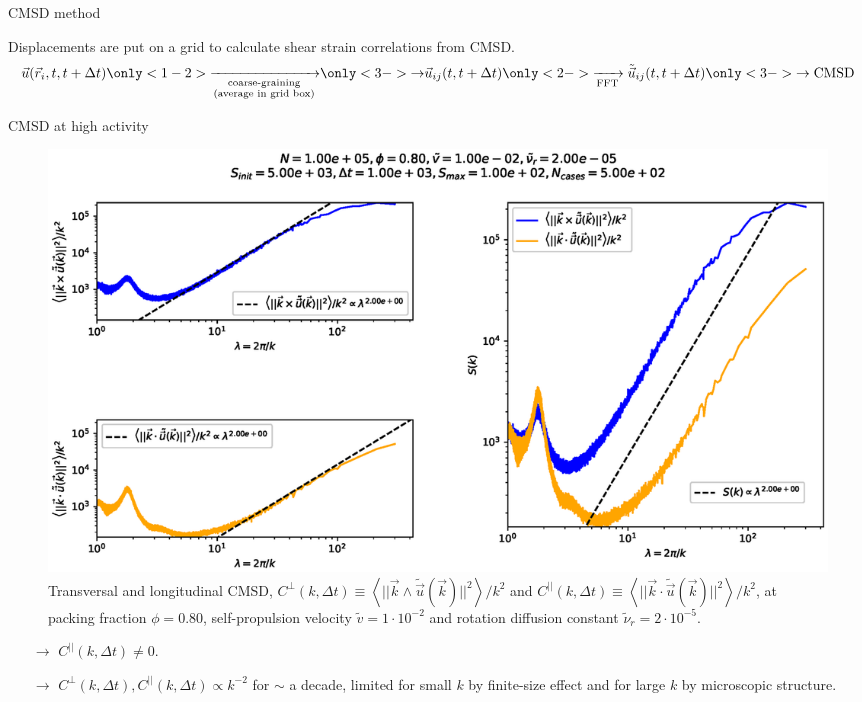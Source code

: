 \documentclass{beamer}
\begin{document}
\begin{frame}{CMSD method}

Displacements are put on a grid to calculate shear strain correlations from CMSD.
\begin{align*}
\vec{u}(\vec{r}_i, t, t + \Delta t) \only<1-2>{\xrightarrow[\substack{\text{coarse-graining}\\\text{(average in grid box)}}]{}}\only<3->{\rightarrow} \vec{u}_{ij}(t, t + \Delta t) \only<2->{\xrightarrow[\text{FFT}]{} \tilde{\vec{u}}_{ij}(t, t + \Delta t)}
\only<3->{\rightarrow \text{CMSD}}
\end{align*}

\end{frame}

\begin{frame}{CMSD at high activity}

\vspace{-0.2cm}
\begin{figure}[h!]
  \centering
  \includegraphics[width=0.8\linewidth]{Cttb_Dk8000_Vj1000_Rg2000_Nq1000_Io5000_Tl1000_Mn1000_Cn5000_Bn3000_XN1500_Yn1500.eps}
  \vspace{-0.8cm}
  \caption{Transversal and longitudinal CMSD, $C^{\perp}(k, \Delta t) \equiv \left<||\vec{k}\wedge\tilde{\vec{u}}(\vec{k})||^2\right>/k^2$ and $C^{||}(k, \Delta t) \equiv \left<||\vec{k}\cdot\tilde{\vec{u}}(\vec{k})||^2\right>/k^2$, at packing fraction $\phi=0.80$, self-propulsion velocity $\tilde{v}=1\cdot10^{-2}$ and rotation diffusion constant $\tilde{\nu}_r=2\cdot10^{-5}$.}
\end{figure}

\vspace{-0.5cm}
\begin{itemize}
  \item[$\rightarrow$] $C^{||}(k, \Delta t) \neq 0$.
  \item[$\rightarrow$] $C^{\perp}(k, \Delta t), C^{||}(k, \Delta t) \propto k^{-2}$ for $\sim$ a decade, limited for small $k$ by finite-size effect and for large $k$ by microscopic structure.
\end{itemize}

\end{frame}
\end{document}
